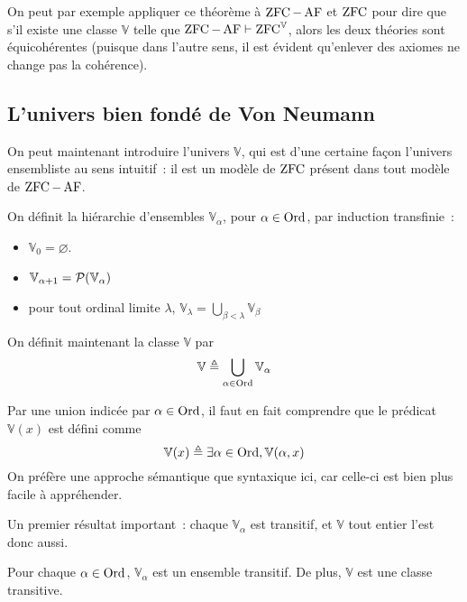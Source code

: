 On peut par exemple appliquer ce théorème à $\operatorname{ZFC} - \operatorname{AF}$ et $\operatorname{ZFC}$ pour dire
que s'il existe une classe $\mathbb V$ telle que
$\operatorname{ZFC} - \operatorname{AF}\vdash \operatorname{ZFC}^\mathbb V$, alors les deux théories sont équicohérentes
(puisque dans l'autre sens, il est évident qu'enlever des axiomes ne change pas
la cohérence).

\subsection{L'univers bien fondé de Von Neumann}

On peut maintenant introduire l'univers $\mathbb V$, qui est d'une certaine
façon l'univers ensembliste au sens intuitif~: il est un modèle de $\operatorname{ZFC}$
présent dans tout modèle de $\operatorname{ZFC} - \operatorname{AF}$.

\begin{definition}
  On définit la hiérarchie d'ensembles $\mathbb V_{\alpha}$, pour
  $\alpha \in \operatorname{Ord}$, par induction transfinie~:
  \begin{itemize}
  \item $\mathbb V_0 = \varnothing$.
  \item $\mathbb V_{\alpha + 1} = \mathcal{P}(\mathbb V_{\alpha})$
  \item pour tout ordinal limite $\lambda$,
    $\displaystyle\mathbb V_\lambda = \bigcup_{\beta < \lambda}\mathbb V_\beta$
  \end{itemize}

  On définit maintenant la classe $\mathbb V$ par
  \[\mathbb V \triangleq \bigcup_{\alpha \in \operatorname{Ord}} \mathbb V_\alpha\]
\end{definition}

\begin{remark}
  Par une union indicée par $\alpha \in \operatorname{Ord}$, il faut en fait comprendre que le
  prédicat $\mathbb V(x)$ est défini comme
  \[\mathbb V(x) \triangleq \exists \alpha \in \operatorname{Ord}, \mathbb V(\alpha,x)\]
  On préfère une approche sémantique que syntaxique ici, car celle-ci est bien
  plus facile à appréhender.
\end{remark}

Un premier résultat important~: chaque $\mathbb V_\alpha$ est transitif, et
$\mathbb V$ tout entier l'est donc aussi.

\begin{property}
  Pour chaque $\alpha\in\operatorname{Ord}$, $\mathbb V_\alpha$ est un ensemble transitif. De
  plus, $\mathbb V$ est une classe transitive.
\end{property}

